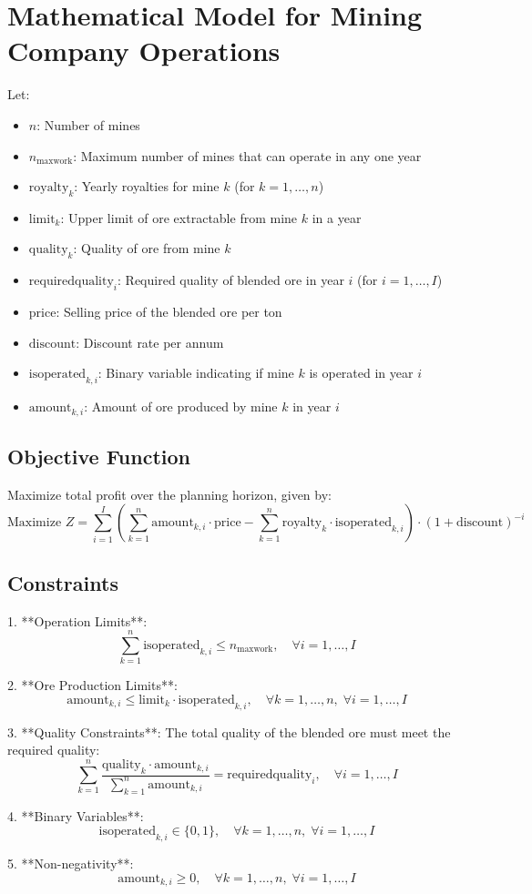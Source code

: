\documentclass{article}
\begin{document}
\section*{Mathematical Model for Mining Company Operations}

Let:
\begin{itemize}
    \item \( n \): Number of mines
    \item \( n_{\text{maxwork}} \): Maximum number of mines that can operate in any one year
    \item \( \text{royalty}_k \): Yearly royalties for mine \( k \) (for \( k = 1, \ldots, n \))
    \item \( \text{limit}_k \): Upper limit of ore extractable from mine \( k \) in a year
    \item \( \text{quality}_k \): Quality of ore from mine \( k \)
    \item \( \text{requiredquality}_i \): Required quality of blended ore in year \( i \) (for \( i = 1, \ldots, I \))
    \item \( \text{price} \): Selling price of the blended ore per ton
    \item \( \text{discount} \): Discount rate per annum
    \item \( \text{isoperated}_{k,i} \): Binary variable indicating if mine \( k \) is operated in year \( i \)
    \item \( \text{amount}_{k,i} \): Amount of ore produced by mine \( k \) in year \( i \)
\end{itemize}

\subsection*{Objective Function}
Maximize total profit over the planning horizon, given by:
\[
\text{Maximize } Z = \sum_{i=1}^{I} \left( \sum_{k=1}^{n} \text{amount}_{k,i} \cdot \text{price} - \sum_{k=1}^{n} \text{royalty}_k \cdot \text{isoperated}_{k,i} \right) \cdot (1 + \text{discount})^{-i}
\]

\subsection*{Constraints}
1. **Operation Limits**:
\[
\sum_{k=1}^{n} \text{isoperated}_{k,i} \leq n_{\text{maxwork}}, \quad \forall i = 1, \ldots, I
\]

2. **Ore Production Limits**:
\[
\text{amount}_{k,i} \leq \text{limit}_k \cdot \text{isoperated}_{k,i}, \quad \forall k = 1, \ldots, n, \; \forall i = 1, \ldots, I
\]

3. **Quality Constraints**:
The total quality of the blended ore must meet the required quality:
\[
\sum_{k=1}^{n} \frac{\text{quality}_k \cdot \text{amount}_{k,i}}{\sum_{k=1}^{n} \text{amount}_{k,i}} = \text{requiredquality}_i, \quad \forall i = 1, \ldots, I
\]

4. **Binary Variables**:
\[
\text{isoperated}_{k,i} \in \{0, 1\}, \quad \forall k = 1, \ldots, n, \; \forall i = 1, \ldots, I
\]

5. **Non-negativity**:
\[
\text{amount}_{k,i} \geq 0, \quad \forall k = 1, \ldots, n, \; \forall i = 1, \ldots, I
\]
\end{document}

